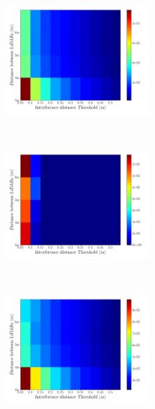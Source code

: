 \begin{figure}[p]
	\centering
	\begin{subfigure}[c]{\textwidth}
		\centering
		\includegraphics[width=0.6\textwidth]{img/lidar-interference/human/interference_roi_distance_color_mesh.png}
		\caption{}
		\label{fig:human:roi-interference-color-mesh}
	\end{subfigure}
	\\ \vspace{2mm}
	\begin{subfigure}[c]{\textwidth}
		\centering
		\includegraphics[width=0.6\textwidth]{img/lidar-interference/human/ground_truth_roi_distance_color_mesh.png}
		\caption{}
		\label{fig:human:roi-ground-truth-color-mesh}
	\end{subfigure}
	\\ \vspace{2mm}
	\begin{subfigure}[c]{\textwidth}
		\centering
		\includegraphics[width=0.6\textwidth]{img/lidar-interference/human/difference_roi_distance_color_mesh.png}
		\caption{}
		\label{fig:human:roi-difference-color-mesh}
	\end{subfigure}


\end{figure}
